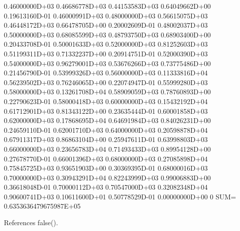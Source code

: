 \begin{DoxyVerb}
    0.46000000D+03    0.46686778D+03    0.44153583D+03    0.64049662D+00    0.19613160D-01    0.46000991D+03
    0.48000000D+03    0.56615075D+03    0.46448172D+03    0.66478705D+00    0.20002609D-01    0.48002037D+03
    0.50000000D+03    0.68085599D+03    0.48793750D+03    0.68903400D+00    0.20433708D-01    0.50001633D+03
    0.52000000D+03    0.81252603D+03    0.51199311D+03    0.71332237D+00    0.20914751D-01    0.52000390D+03
    0.54000000D+03    0.96279001D+03    0.53676266D+03    0.73775486D+00    0.21456790D-01    0.53999326D+03
    0.56000000D+03    0.11333816D+04    0.56239502D+03    0.76246065D+00    0.22074947D-01    0.55999280D+03
    0.58000000D+03    0.13261708D+04    0.58909059D+03    0.78760893D+00    0.22790623D-01    0.58000418D+03
    0.60000000D+03    0.15432192D+04    0.61712901D+03    0.81343122D+00    0.23635444D-01    0.60001858D+03
    0.62000000D+03    0.17868695D+04    0.64691984D+03    0.84026231D+00    0.24659110D-01    0.62001710D+03
    0.64000000D+03    0.20598878D+04    0.67911317D+03    0.86863104D+00    0.25947611D-01    0.63998803D+03
    0.66000000D+03    0.23656783D+04    0.71493433D+03    0.89954128D+00    0.27678770D-01    0.66001396D+03
    0.68000000D+03    0.27085898D+04    0.75845725D+03    0.93651903D+00    0.30369395D-01    0.68000016D+03
    0.70000000D+03    0.30943291D+04    0.82243999D+03    0.99006883D+00    0.36618048D-01    0.70000112D+03
    0.70547000D+03    0.32082348D+04    0.90600741D+03    0.10611600D+01    0.50778529D-01    0.00000000D+00
0         SUM=  0.6353636479675987E+05 \end{DoxyVerb}
 

References false().

\mbox{\label{numdiff_8f90_a5d78de65cd7fa1c21f36db3018f1ffaf}} 
